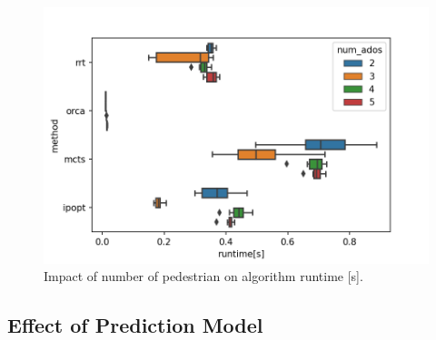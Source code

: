 \begin{figure}[!ht]
\begin{center}
\includegraphics[width=\imgwidth]{images/runtime_peds.png}
\caption{Impact of number of pedestrian on algorithm runtime [s].}
\end{center}
\label{img:runtime_num_pedestrian}
\end{figure}

\subsection{Effect of Prediction Model}


